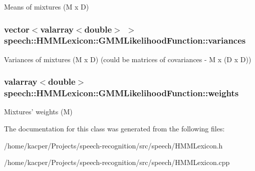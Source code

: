 Means of mixtures (M x D) \hypertarget{classspeech_1_1HMMLexicon_1_1GMMLikelihoodFunction_a9e996ef1a355aafa7143b5e5d2bf6b8a}{
\subsubsection[{variances}]{\setlength{\rightskip}{0pt plus 5cm}vector$<$valarray$<$double$>$ $>$ speech\+::\+H\+M\+M\+Lexicon\+::\+G\+M\+M\+Likelihood\+Function\+::variances\hspace{0.3cm}{\ttfamily [protected]}}}\label{classspeech_1_1HMMLexicon_1_1GMMLikelihoodFunction_a9e996ef1a355aafa7143b5e5d2bf6b8a}
Variances of mixtures (M x D) (could be matrices of covariances -\/ M x (D x D)) \hypertarget{classspeech_1_1HMMLexicon_1_1GMMLikelihoodFunction_aa3511faf53d4e9209d46a4af968ae4a7}{
\subsubsection[{weights}]{\setlength{\rightskip}{0pt plus 5cm}valarray$<$double$>$ speech\+::\+H\+M\+M\+Lexicon\+::\+G\+M\+M\+Likelihood\+Function\+::weights\hspace{0.3cm}{\ttfamily [protected]}}}\label{classspeech_1_1HMMLexicon_1_1GMMLikelihoodFunction_aa3511faf53d4e9209d46a4af968ae4a7}
Mixtures' weights (M) 

The documentation for this class was generated from the following files\+:\begin{DoxyCompactItemize}
\item 
/home/kacper/\+Projects/speech-\/recognition/src/speech/H\+M\+M\+Lexicon.\+h\item 
/home/kacper/\+Projects/speech-\/recognition/src/speech/H\+M\+M\+Lexicon.\+cpp\end{DoxyCompactItemize}
